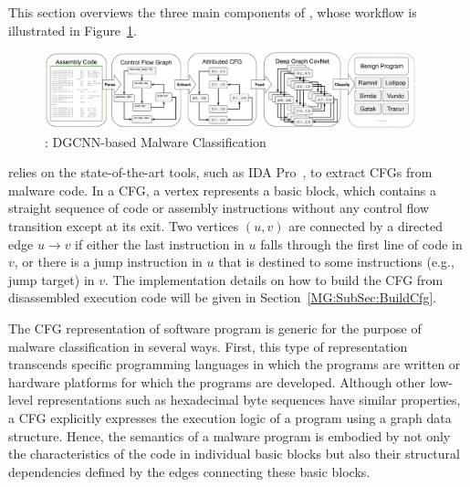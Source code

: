 \label{MG:Sec:System}

This section overviews the three main components of \sysname, whose workflow is illustrated in Figure~\ref{MG:Fig:SystemPipeline}.

\begin{figure}[htbp]
    \centerline{\includegraphics[width=0.96\textwidth]{Magic/figures/SystemPipeline.eps}}
    \caption{\sysname: DGCNN-based Malware Classification}
    \label{MG:Fig:SystemPipeline}
\end{figure}

\label{MG:Subsec:ConstructCfg}
\sysname relies on the state-of-the-art tools, such as IDA Pro~\cite{bib:idapro}, to extract CFGs from malware code.
In a CFG, a vertex represents a basic block, which contains a straight sequence of code or assembly instructions without any control flow transition except at its exit.
Two vertices $(u, v)$ are connected by a directed edge $u \rightarrow v$ if either the last instruction in $u$ falls through the first line of code in $v$,
or there is a jump instruction in $u$ that is destined to some instructions (e.g., jump target) in $v$.
The implementation details on how to build the CFG from disassembled execution code will be given in Section~\ref{MG:SubSec:BuildCfg}.

\label{MG:SubSec:Cfg2Acfg}
The CFG representation of software program is generic for the purpose of malware classification in several ways.
First, this type of representation transcends specific programming languages in which the programs are written or hardware platforms for which the programs are developed.
Although other low-level representations such as hexadecimal byte sequences have similar properties, a CFG explicitly expresses the execution logic of a program using a graph data structure.
Hence, the semantics of a malware program is embodied by not only the characteristics of the code in individual basic blocks but also their structural dependencies defined by the edges connecting these basic blocks. 



